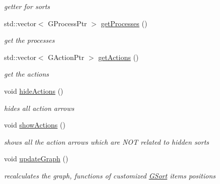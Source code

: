\begin{DoxyCompactItemize}
\begin{DoxyCompactList}\small\item\em getter for sorts \end{DoxyCompactList}\item 
\hypertarget{class_p_h_scene_a90867c99c8cc58ca2c7f33d498bffe66}{std\-::vector$<$ \-G\-Process\-Ptr $>$ \hyperlink{class_p_h_scene_a90867c99c8cc58ca2c7f33d498bffe66}{get\-Processes} ()}\label{class_p_h_scene_a90867c99c8cc58ca2c7f33d498bffe66}

\begin{DoxyCompactList}\small\item\em get the processes \end{DoxyCompactList}\item 
\hypertarget{class_p_h_scene_af1201a8cee5ca753cbe75cbe3d6435c5}{std\-::vector$<$ \-G\-Action\-Ptr $>$ \hyperlink{class_p_h_scene_af1201a8cee5ca753cbe75cbe3d6435c5}{get\-Actions} ()}\label{class_p_h_scene_af1201a8cee5ca753cbe75cbe3d6435c5}

\begin{DoxyCompactList}\small\item\em get the actions \end{DoxyCompactList}\item 
\hypertarget{class_p_h_scene_ab2e20c3ef500db7facadd0ea9d277803}{void \hyperlink{class_p_h_scene_ab2e20c3ef500db7facadd0ea9d277803}{hide\-Actions} ()}\label{class_p_h_scene_ab2e20c3ef500db7facadd0ea9d277803}

\begin{DoxyCompactList}\small\item\em hides all action arrows \end{DoxyCompactList}\item 
\hypertarget{class_p_h_scene_a73f4bf5b26c0849c53e93788eacf085a}{void \hyperlink{class_p_h_scene_a73f4bf5b26c0849c53e93788eacf085a}{show\-Actions} ()}\label{class_p_h_scene_a73f4bf5b26c0849c53e93788eacf085a}

\begin{DoxyCompactList}\small\item\em shows all the action arrows which are \-N\-O\-T related to hidden sorts \end{DoxyCompactList}\item 
\hypertarget{class_p_h_scene_abd6eb00cf340fba49243383af1650ad6}{void \hyperlink{class_p_h_scene_abd6eb00cf340fba49243383af1650ad6}{update\-Graph} ()}\label{class_p_h_scene_abd6eb00cf340fba49243383af1650ad6}

\begin{DoxyCompactList}\small\item\em recalculates the graph, functions of customized \hyperlink{class_g_sort}{\-G\-Sort} items positions \end{DoxyCompactList}\end{DoxyCompactItemize}
